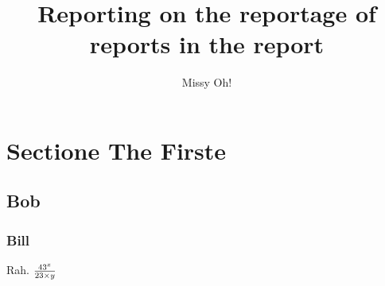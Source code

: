 \documentclass[10pt,a4paper]{article}
\author{Missy Oh!}
\title{Reporting on the reportage of reports in the report}
\begin{document}
\maketitle
\tableofcontents

\section{Sectione The Firste}
\subsection{Bob}
\subsubsection{Bill}
Rah.
$43^x \over 23 \times y$
\end{document}

